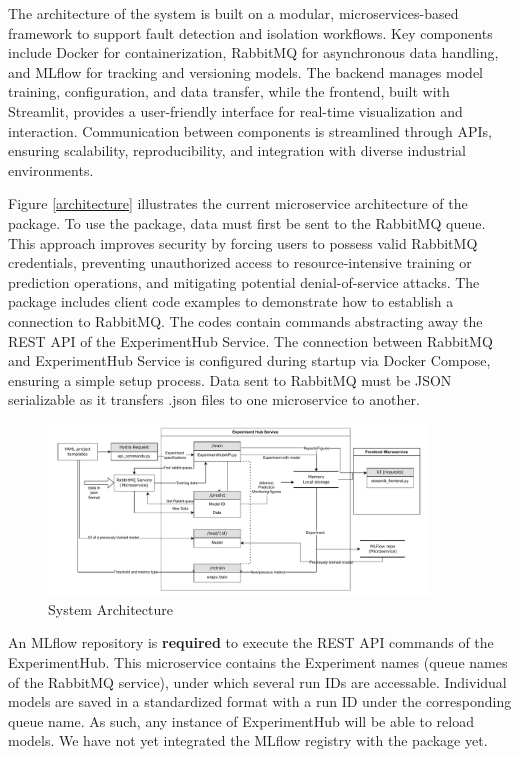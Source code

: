 \documentclass[preprint,12pt, a4paper]{elsarticle}
\begin{document}
The architecture of the system is built on a modular, microservices-based framework to support fault detection and isolation workflows. Key components include Docker for containerization, RabbitMQ for asynchronous data handling, and MLflow for tracking and versioning models. The backend manages model training, configuration, and data transfer, while the frontend, built with Streamlit, provides a user-friendly interface for real-time visualization and interaction. Communication between components is streamlined through APIs, ensuring scalability, reproducibility, and integration with diverse industrial environments. 

Figure \ref{architecture} illustrates the current microservice architecture of the package. To use the package, data must first be sent to the RabbitMQ queue. This approach improves security by forcing users to possess valid RabbitMQ credentials, preventing unauthorized access to resource-intensive training or prediction operations, and mitigating potential denial-of-service attacks. The package includes client code examples to demonstrate how to establish a connection to RabbitMQ. The codes contain commands abstracting away the REST API of the ExperimentHub Service. The connection between RabbitMQ and ExperimentHub Service is configured during startup via Docker Compose, ensuring a simple setup process. Data sent to RabbitMQ must be JSON serializable as it transfers .json files to one microservice to another.

\begin{figure}[h!]
\centering
\includegraphics[width=0.9\textwidth, clip, trim={0 0 0 0}]{figs/api_arch.pdf}
\caption{System Architecture}
\label{fig1}
\end{figure}


An MLflow repository is \textbf{required} to execute the REST API commands of the ExperimentHub. This microservice contains the Experiment names (queue names of the RabbitMQ service), under which several run IDs are accessable. Individual models are saved in a standardized format with a run ID under the corresponding queue name. As such, any instance of ExperimentHub will be able to reload models. We have not yet integrated the MLflow registry with the package yet.
\end{document}
